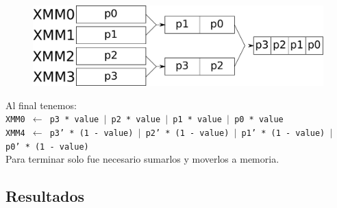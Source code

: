 \begin{figure}[h!]
	\centering
	\includegraphics[scale=0.5]{images/MergeASM2_1}
\end{figure}

Al final tenemos:\\

\noindent
\texttt{XMM0 $\gets$ p3 * value $\vert$ p2 * value $\vert$ p1 * value $\vert$ p0 * value}\\
\texttt{XMM4 $\gets$ p3' * (1 - value) $\vert$ p2' * (1 - value) $\vert$ p1' * (1 - value) $\vert$ p0' * (1 - value)}\\

Para terminar solo fue necesario sumarlos y moverlos a memoria.

\subsection{Resultados}







